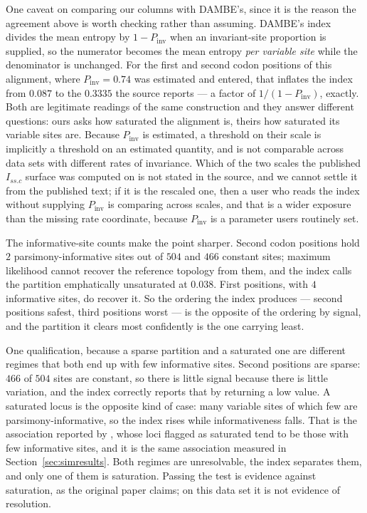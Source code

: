 \documentclass[11pt]{article}
\newcommand{\Issc}{I_{ss.c}}
\theoremstyle{definition}
\theoremstyle{remark}
\begin{document}
One caveat on comparing our columns with DAMBE's, since it is the reason the
agreement above is worth checking rather than assuming. DAMBE's index divides
the mean entropy by $1-P_{\mathrm{inv}}$ when an invariant-site proportion is
supplied, so the numerator becomes the mean entropy \emph{per variable site}
while the denominator is unchanged. For the first and second codon positions
of this alignment, where $P_{\mathrm{inv}}=0.74$ was estimated and entered,
that inflates the index from $0.087$ to the $0.3335$ the source reports --- a
factor of $1/(1-P_{\mathrm{inv}})$, exactly. Both are legitimate readings of
the same construction and they answer different questions: ours asks how
saturated the alignment is, theirs how saturated its variable sites are.
Because $P_{\mathrm{inv}}$ is estimated, a threshold on their scale is
implicitly a threshold on an estimated quantity, and is not comparable across
data sets with different rates of invariance. Which of the two scales the
published $\Issc$ surface was computed on is not stated in the source, and we
cannot settle it from the published text; if it is the rescaled one, then a
user who reads the index without supplying $P_{\mathrm{inv}}$ is comparing
across scales, and that is a wider exposure than the missing rate coordinate,
because $P_{\mathrm{inv}}$ is a parameter users routinely set.

The informative-site counts make the point sharper. Second codon positions
hold $2$ parsimony-informative sites out of $504$ and $466$ constant sites;
maximum likelihood cannot recover the reference topology from them, and the
index calls the partition emphatically unsaturated at $0.038$. First
positions, with $4$ informative sites, do recover it. So the ordering the
index produces --- second positions safest, third positions worst --- is the
opposite of the ordering by signal, and the partition it clears most
confidently is the one carrying least.

One qualification, because a sparse partition and a saturated one are
different regimes that both end up with few informative sites. Second
positions are sparse: $466$ of $504$ sites are constant, so there is little
signal because there is little variation, and the index correctly reports
that by returning a low value. A saturated locus is the opposite kind of
case: many variable sites of which few are parsimony-informative, so the
index rises while informativeness falls. That is the association reported by
\citet{duchene2022saturation}, whose loci flagged as saturated tend to be
those with few informative sites, and it is the same association measured in
Section~\ref{sec:simresults}. Both regimes are unresolvable, the index
separates them, and only one of them is saturation. Passing the test is evidence against
saturation, as the original paper claims; on this data set it is not evidence
of resolution.
\end{document}
